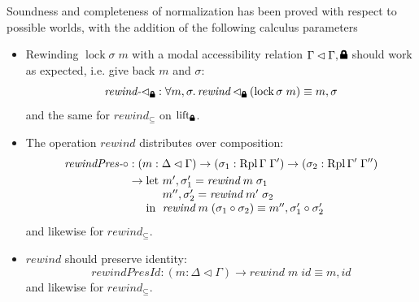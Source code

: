 \documentclass[12pt,twoside,openright]{report}
\numberwithin{equation}{chapter}
\numberwithin{figure}{chapter}
\numberwithin{table}{chapter}
\theoremstyle{definition}\newtheorem{definition}{Definition}
\newcommand{\lock}{\text{\tikz[baseline]{
      \fill[rounded corners=.1ex] (-.75ex,0) rectangle (.75ex,1ex);
      \draw[line width=.3ex] (-.4ex,.5ex) -- ++(0,.75ex) arc (180:0:.4ex) -- ++(0,-.75ex);
}}}
\begin{document}
Soundness and completeness of normalization
has been proved with respect to possible worlds,
with the addition of the following calculus parameters
\begin{itemize}
\item Rewinding $\operatorname{lock} \sigma \; m$
  with a modal accessibility relation $\Gamma \lhd \Gamma, \lock$
  should work as expected, i.e. give back $m$ and $\sigma$:
  $$ \textit{rewind-$\lhd_\lock$} : \forall m, \sigma. \, \textit{rewind} \lhd_\lock (\operatorname{lock} \sigma \; m) \equiv m , \sigma $$
  and the same for $\textit{rewind}_\subseteq$ on $\operatorname{lift}_\lock$.
\item The operation $\textit{rewind}$ distributes over composition:
  \begin{equation}\label{eq:rewindPres-circ}
    \begin{split}
      \textit{rewindPres-$\circ$} &: (m : \Delta\lhd\Gamma) \to (\sigma_1 : \operatorname{Rpl} \Gamma \; \Gamma') \to (\sigma_2 : \operatorname{Rpl} \Gamma' \; \Gamma'') \\
      &\to
      \begin{array}[t]{@{}l@{}l@{}}
        \text{let } & m' , \sigma_1' = \textit{rewind} \; m \; \sigma_1 \\
        & m'' , \sigma_2' = \textit{rewind} \; m' \; \sigma_2 \\
        \text{in } & \textit{rewind} \; m \; (\sigma_1 \circ \sigma_2) \equiv m'' , \sigma_1' \circ \sigma_2'
      \end{array}
    \end{split}
  \end{equation}
  and likewise for $\textit{rewind}_\subseteq$.
\item $\textit{rewind}$ should preserve identity:
  $$ \textit{rewindPresId} : (m : \Delta\lhd\Gamma) \to \textit{rewind} \; m \; \textit{id} \equiv m , \textit{id} $$
  and likewise for $\textit{rewind}_\subseteq$.


\end{itemize}
\end{document}
